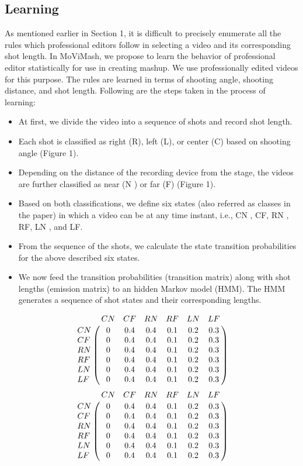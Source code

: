 \documentclass{sig-alternate}
\begin{document}
\subsection{Learning}
As mentioned earlier in Section 1, it is difficult to precisely enumerate all the rules which professional editors follow in selecting a video and its corresponding shot length. In MoViMash, we propose to learn the behavior of professional editor statistically for use in creating mashup. We use professionally edited videos for this purpose. The rules are learned in terms of shooting angle, shooting distance, and shot length. Following are the steps taken in the process of learning:
\begin{itemize}
    \item At first, we divide the video into a sequence of shots and record shot length.
    \item Each shot is classified as right (R), left (L), or center (C) based on shooting angle (Figure 1).
    \item Depending on the distance of the recording device from the stage, the videos are further classified as near (N ) or far (F) (Figure 1).
    \item Based on both classifications, we define six states (also referred as classes in the paper) in which a video can be at any time instant, i.e., CN , CF, RN , RF, LN , and LF.
    \item From the sequence of the shots, we calculate the state transition probabilities for the above described six states.
    \item We now feed the transition probabilities (transition matrix) along with shot lengths (emission matrix) to an hidden Markov model (HMM). The HMM generates a sequence of shot states and their corresponding lengths.
\end{itemize}
\[
  \bordermatrix{  &CN &CF &RN &RF &LN &LF \cr
               CN &0   & 0.4  & 0.4  & 0.1  & 0.2  & 0.3  \cr
               CF  &0   & 0.4  & 0.4  & 0.1  & 0.2  & 0.3   \cr
               RN  &0   & 0.4  & 0.4  & 0.1  & 0.2  & 0.3  \cr
               RF  &0   & 0.4  & 0.4  & 0.1  & 0.2  & 0.3  \cr
               LN  &0   & 0.4  & 0.4  & 0.1  & 0.2  & 0.3   \cr
               LF  &0   & 0.4  & 0.4  & 0.1  & 0.2  & 0.3   \cr
  }
\]
\[
  \bordermatrix{  &CN &CF &RN &RF &LN &LF \cr
               CN &0   & 0.4  & 0.4  & 0.1  & 0.2  & 0.3  \cr
               CF  &0   & 0.4  & 0.4  & 0.1  & 0.2  & 0.3   \cr
               RN  &0   & 0.4  & 0.4  & 0.1  & 0.2  & 0.3  \cr
               RF  &0   & 0.4  & 0.4  & 0.1  & 0.2  & 0.3  \cr
               LN  &0   & 0.4  & 0.4  & 0.1  & 0.2  & 0.3   \cr
               LF  &0   & 0.4  & 0.4  & 0.1  & 0.2  & 0.3   \cr
  }
\]
\end{document}
